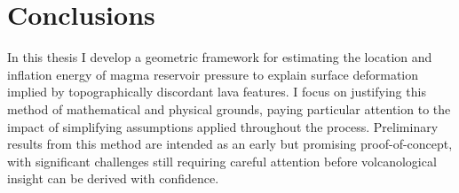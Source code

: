 \chapter{Conclusions}

In this thesis I develop a geometric framework for estimating the location and inflation energy of magma reservoir pressure to explain surface deformation implied by topographically discordant lava features. I focus on justifying this method of mathematical and physical grounds, paying particular attention to the impact of simplifying assumptions applied throughout the process. Preliminary results from this method are intended as an early but promising proof-of-concept, with significant challenges still requiring careful attention before volcanological insight can be derived with confidence.
